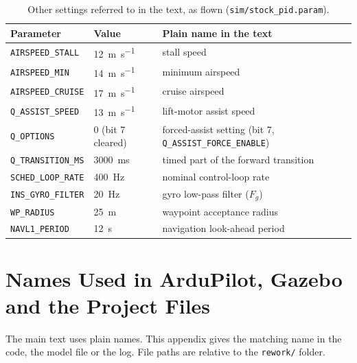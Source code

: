 \documentclass{article}
\begin{document}
\begin{table}[H]
    \centering
    \caption{Other settings referred to in the text, as flown (\texttt{sim/stock\_pid.param}).}
    \label{tab:appendix-other-params}
    \begin{tabular}{lll}
        \toprule
        Parameter & Value & Plain name in the text \\
        \midrule
        \texttt{AIRSPEED\_STALL}  & \SI{12}{\meter\per\second} & stall speed \\
        \texttt{AIRSPEED\_MIN}    & \SI{14}{\meter\per\second} & minimum airspeed \\
        \texttt{AIRSPEED\_CRUISE} & \SI{17}{\meter\per\second} & cruise airspeed \\
        \texttt{Q\_ASSIST\_SPEED} & \SI{13}{\meter\per\second} & lift-motor assist speed \\
        \texttt{Q\_OPTIONS}       & 0 (bit 7 cleared) & forced-assist setting (bit 7, \texttt{Q\_ASSIST\_FORCE\_ENABLE}) \\
        \texttt{Q\_TRANSITION\_MS} & \SI{3000}{\milli\second} & timed part of the forward transition \\
        \texttt{SCHED\_LOOP\_RATE} & \SI{400}{\hertz} & nominal control-loop rate \\
        \texttt{INS\_GYRO\_FILTER} & \SI{20}{\hertz} & gyro low-pass filter ($F_g$) \\
        \texttt{WP\_RADIUS}       & \SI{25}{\meter} & waypoint acceptance radius \\
        \texttt{NAVL1\_PERIOD}    & \SI{12}{\second} & navigation look-ahead period \\
        \bottomrule
    \end{tabular}
\end{table}

\section{Names Used in ArduPilot, Gazebo and the Project Files}
\label{sec:appendix-names}
The main text uses plain names. This appendix gives the matching name in the code, the model file or the log. File paths are relative to the \texttt{rework/} folder.
\end{document}

